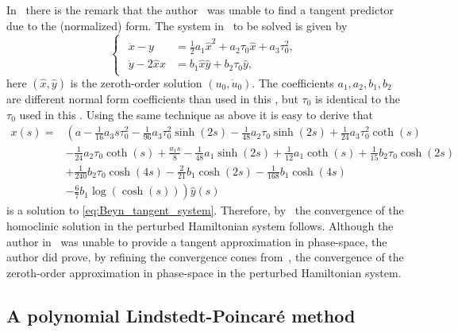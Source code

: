 \begin{remark}
In~\cite{Kuznetsov2014improved} there is the remark that the
author~\cite{Beyn_1994} was unable to find a tangent predictor due to the
(normalized) form. The system in~\cite[Equation (4.5)]{Beyn_1994} to be solved
is given by
\begin{equation}
  \label{eq:Beyn_tangent_system}
  \begin{cases}
  \begin{aligned}
  \dot x  - y &= \frac12 a_1 \hat x^2 + a_2 \tau_0 \hat x + a_3 \tau_0^2, \\
  \dot y -2\hat x x &=  b_1 \hat x \hat y + b_2 \tau_0 \hat y,
  \end{aligned}
  \end{cases}
\end{equation}
here $(\hat x, \hat y)$ is the zeroth-order solution $(u_0, \dot u_0)$. The
coefficients $a_1,a_2,b_1,b_2$ are different normal form coefficients than used
in this \paper{}, but $\tau_0$ is identical to the $\tau_0$ used in this \paper.
Using the same technique as above it is easy to derive that
\begin{align*}
x(s) ={}& \left(a -\frac{1}{16} a_3 s  \tau _0^2-\frac{1}{96} a_3 \tau _0^2
	\sinh (2 s ) -\frac{1}{48} a_2 \tau _0 \sinh (2 s )+\frac{1}{24} a_3 \tau _0^2
	\coth (s ) \right . \\ 
					&-\frac{1}{24} a_2 \tau _0 \coth (s )+\frac{a_1 s
	}{8}-\frac{1}{48} a_1 \sinh (2 s ) +\frac{1}{12} a_1 \coth (s )+\frac{1}{15}
	b_2 \tau_0 \cosh (2 s ) \\ 
	&+\frac{1}{240} b_2 \tau _0 \cosh (4 s
	)-\frac{2}{21} b_1 \cosh (2 s )-\frac{1}{168} b_1 \cosh (4 s ) \\ 
	&\left.  -\frac{6}{7} b_1 \log (\cosh (s )) \right) \hat y(s)
\end{align*}
is a solution to \cref{eq:Beyn_tangent_system}. Therefore,
by~\cite{Keller1977} the convergence of the homoclinic solution in
the perturbed Hamiltonian system follows. Although the author
in~\cite{Beyn_1994} was unable to provide a tangent approximation in
phase-space, the author did prove, by refining the convergence cones
from~\cite{JepsonDecker1986}, the convergence of the zeroth-order approximation in
phase-space in the perturbed Hamiltonian system.
\end{remark}


\subsection{A polynomial Lindstedt-Poincar\'e method}
\label{sec:PolynomailLindstedtPoincare}


